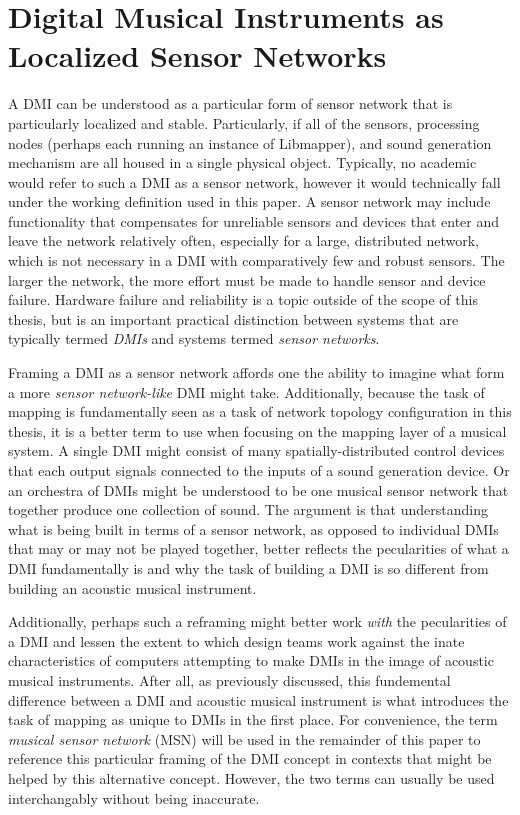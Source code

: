 \section{Digital Musical Instruments as Localized Sensor Networks}

A DMI can be understood as a particular form of sensor network that is particularly localized and stable. Particularly, if all of the sensors, processing nodes (perhaps each running an instance of Libmapper), and sound generation mechanism are all housed in a single physical object. Typically, no academic would refer to such a DMI as a sensor network, however it would technically fall under the working definition used in this paper. A sensor network may include functionality that compensates for unreliable sensors and devices that enter and leave the network relatively often, especially for a large, distributed network, which is not necessary in a DMI with comparatively few and robust sensors. The larger the network, the more effort must be made to handle sensor and device failure. Hardware failure and reliability is a topic outside of the scope of this thesis, but is an important practical distinction between systems that are typically termed \emph{DMIs} and systems termed \emph{sensor networks}.

Framing a DMI as a sensor network affords one the ability to imagine what form a more \emph{sensor network-like} DMI might take. Additionally, because the task of mapping is fundamentally seen as a task of network topology configuration in this thesis, it is a better term to use when focusing on the mapping layer of a musical system. A single DMI might consist of many spatially-distributed control devices that each output signals connected to the inputs of a sound generation device. Or an orchestra of DMIs might be understood to be one musical sensor network that together produce one collection of sound. The argument is that understanding what is being built in terms of a sensor network, as opposed to individual DMIs that may or may not be played together, better reflects the pecularities of what a DMI fundamentally is and why the task of building a DMI is so different from building an acoustic musical instrument.

Additionally, perhaps such a reframing might better work \emph{with} the pecularities of a DMI and lessen the extent to which design teams work against the inate characteristics of computers attempting to make DMIs in the image of acoustic musical instruments. After all, as previously discussed, this fundemental difference between a DMI and acoustic musical instrument is what introduces the task of mapping as unique to DMIs in the first place. For convenience, the term \emph{musical sensor network} (MSN) will be used in the remainder of this paper to reference this particular framing of the DMI concept in contexts that might be helped by this alternative concept. However, the two terms can usually be used interchangably without being inaccurate. 

